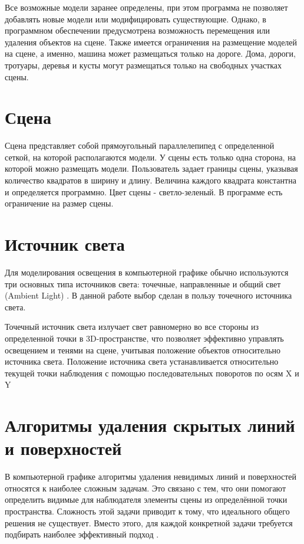 Все возможные модели заранее определены, при этом программа не позволяет добавлять новые модели или модифицировать существующие. Однако, в программном обеспечении предусмотрена возможность перемещения или удаления объектов на сцене. Также имеется ограничения на размещение моделей на сцене, а именно, машина может размещаться только на дороге. Дома, дороги, тротуары, деревья и кусты могут размещаться только на свободных участках сцены.

\section*{Сцена}
	Сцена представляет собой прямоугольный параллелепипед с определенной сеткой, на которой располагаются модели. У сцены есть только одна сторона, на которой можно размещать модели. Пользователь задает границы сцены, указывая количество квадратов в ширину и длину. Величина каждого квадрата константна и определяется программно. Цвет сцены - светло-зеленый. В программе есть ограничение на размер сцены.


\section*{Источник света}

Для моделирования освещения в компьютерной графике обычно используются три основных типа источников света: точечные, направленные и общий свет (Ambient Light) \cite{light}. В данной работе выбор сделан в пользу точечного источника света.

Точечный источник света излучает свет равномерно во все стороны из определенной точки в 3D-пространстве, что позволяет эффективно управлять освещением и тенями на сцене, учитывая положение объектов относительно источника света. Положение источника света устанавливается относительно текущей точки наблюдения с помощью последовательных поворотов по осям X и Y \cite{light}


\section{Алгоритмы удаления скрытых линий и поверхностей}

В компьютерной графике алгоритмы удаления невидимых линий и поверхностей относятся к наиболее сложным задачам. Это связано с тем, что они помогают определить видимые для наблюдателя элементы сцены из определённой точки пространства. Сложность этой задачи приводит к тому, что идеального общего решения не существует. Вместо этого, для каждой конкретной задачи требуется подбирать наиболее эффективный подход \cite{del_line}.

